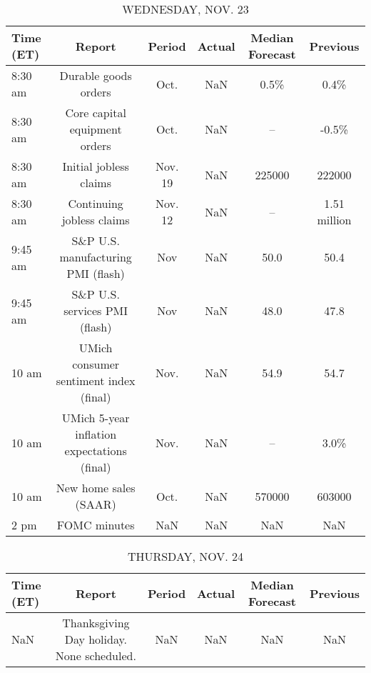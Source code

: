 \documentclass{article}%
\begin{document}
\begin{table}[htbp]%
\caption{WEDNESDAY, NOV. 23}%
\centering%
\begin{adjustbox}{width=1\textwidth}%
\begin{tabular}{lccccc}
\toprule
Time (ET) &                                      Report &  Period & Actual & Median Forecast &     Previous \\
\midrule
  8:30 am &                        Durable goods orders &    Oct. &    NaN &            0.5\% &         0.4\% \\
  8:30 am &               Core capital equipment orders &    Oct. &    NaN &              -- &        -0.5\% \\
  8:30 am &                      Initial jobless claims & Nov. 19 &    NaN &          225000 &       222000 \\
  8:30 am &                   Continuing jobless claims & Nov. 12 &    NaN &              -- & 1.51 million \\
  9:45 am &          S\&P U.S. manufacturing PMI (flash) &     Nov &    NaN &            50.0 &         50.4 \\
  9:45 am &               S\&P U.S. services PMI (flash) &     Nov &    NaN &            48.0 &         47.8 \\
    10 am &      UMich consumer sentiment index (final) &    Nov. &    NaN &            54.9 &         54.7 \\
    10 am & UMich 5-year inflation expectations (final) &    Nov. &    NaN &              -- &         3.0\% \\
    10 am &                       New home sales (SAAR) &    Oct. &    NaN &          570000 &       603000 \\
     2 pm &                                FOMC minutes &     NaN &    NaN &             NaN &          NaN \\
\bottomrule
\end{tabular}
%
\end{adjustbox}%
\end{table}

%


\begin{table}[htbp]%
\caption{THURSDAY, NOV. 24}%
\centering%
\begin{adjustbox}{width=1\textwidth}%
\begin{tabular}{lccccc}
\toprule
Time (ET) &                                    Report & Period & Actual & Median Forecast & Previous \\
\midrule
      NaN & Thanksgiving Day holiday. None scheduled. &    NaN &    NaN &             NaN &      NaN \\
\bottomrule
\end{tabular}
%
\end{adjustbox}%
\end{table}
\end{document}
